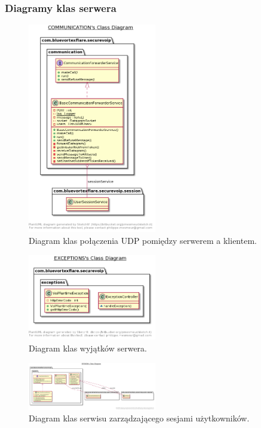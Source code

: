 \subsubsection{Diagramy klas serwera}
\begin{figure}[H]
	\includegraphics[width=0.5\textwidth]{images/uml/s1.png}
	\centering	
	\caption{\centering Diagram klas połączenia UDP pomiędzy serwerem a klientem.}
\end{figure}
\begin{figure}[H]
	\includegraphics[width=0.5\textwidth]{images/uml/s2.png}
	\centering	
	\caption{\centering Diagram klas wyjątków serwera.}
\end{figure}
\begin{figure}[H]
	\includegraphics[width=0.5\textwidth]{images/uml/s3.png}
	\centering	
	\caption{\centering Diagram klas serwisu zarządzającego sesjami użytkowników.}
\end{figure}
